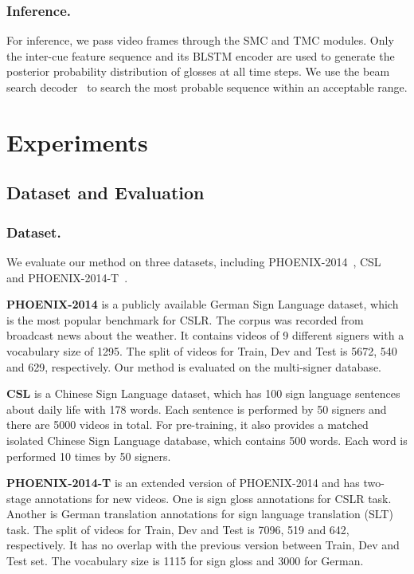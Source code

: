 \documentclass[letterpaper]{article} \usepackage{aaai20}  \usepackage{times}  \usepackage{helvet} \usepackage{courier}  \usepackage[hyphens]{url}  \usepackage{graphicx} \urlstyle{rm} \def\UrlFont{\rm}  \usepackage{graphicx}  \frenchspacing  \setlength{\pdfpagewidth}{8.5in}  \setlength{\pdfpageheight}{11in}
\begin{document}
\subsubsection{Inference.}
For inference, we pass video frames through the SMC and TMC modules. Only the inter-cue feature sequence and its BLSTM encoder are used to generate the posterior probability distribution of glosses at all time steps. We use the beam search decoder~\cite{deepspeech} to search the most probable sequence within an acceptable range.

\section{Experiments}
\subsection{Dataset and Evaluation}
\subsubsection{Dataset.}
We evaluate our method on three datasets, including PHOENIX-2014~\cite{phoenixdataset2014}, CSL~\cite{han,hlstm} and PHOENIX-2014-T~\cite{phoenix2014t}. 

\textbf{PHOENIX-2014} is a publicly available German Sign Language dataset, which is the most popular benchmark for CSLR. The corpus was recorded from broadcast news about the weather. It contains videos of 9 different signers with a vocabulary size of 1295. The split of videos for Train, Dev and Test is 5672, 540 and 629, respectively. Our method is evaluated on the multi-signer database.

\textbf{CSL} is a Chinese Sign Language dataset, which has 100 sign language sentences about daily life with 178 words. Each sentence is performed by 50 signers and there are 5000 videos in total. For pre-training, it also provides a matched isolated Chinese Sign Language database,  
which contains 500 words. Each word is performed 10 times by 50 signers. 

\textbf{PHOENIX-2014-T} is an extended version of PHOENIX-2014 and has two-stage annotations for new videos.
One is sign gloss annotations for CSLR task. Another is German translation annotations for sign language translation (SLT) task. The split of videos for Train, Dev and Test is 7096, 519 and 642, respectively. It has no overlap with the previous version between Train, Dev and Test set. The vocabulary size is 1115 for sign gloss and 3000 for German. 
\end{document}
